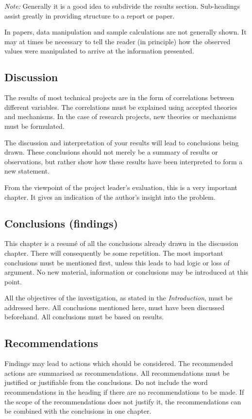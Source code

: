 \documentclass[a5paper, 10pt]{article}
\newcommand{\subsectionname}[1]{\emph{#1}}
\begin{document}
\emph{Note:} Generally it is a good idea to subdivide the results section.
Sub-headings assist greatly in providing structure to a report or
paper.

In papers, data manipulation and sample calculations are not generally
shown.  It may at times be necessary to tell the reader (in principle)
how the observed values were manipulated to arrive at the information
presented.

\subsection{Discussion}
\label{sec:discussion}
The results of most technical projects are in the form of correlations
between different variables.  The correlations must be explained using
accepted theories and mechanisms.  In the case of research projects,
new theories or mechanisms must be formulated.

The discussion and interpretation of your results will lead to
conclusions being drawn.  These conclusions should not merely be a
summary of results or observations, but rather show how these results
have been interpreted to form a new statement.

From the viewpoint of the project leader's evaluation, this is a very
important chapter.  It gives an indication of the author's insight
into the problem.

\subsection{Conclusions (findings)}
\label{sec:conclusions}
This chapter is a resum\'e of all the conclusions already drawn in the
discussion chapter.  There will consequently be some repetition.  The
most important conclusions must be mentioned first, unless this leads
to bad logic or loss of argument.  No new material, information or
conclusions may be introduced at this point.

All the objectives of the investigation, as stated in the
\subsectionname{Introduction}, must be addressed here.  All conclusions
mentioned here, must have been discussed beforehand.  All conclusions
must be based on results.

\subsection{Recommendations}
\label{sec:recommendations}

Findings may lead to actions which should be considered.  The
recommended actions are summarised as recommendations.  All
recommendations must be justified or justifiable from the conclusions.
Do not include the word recommendations in the heading if there are no
recommendations to be made.  If the scope of the recommendations does
not justify it, the recommendations can be combined with the
conclusions in one chapter.
\end{document}
